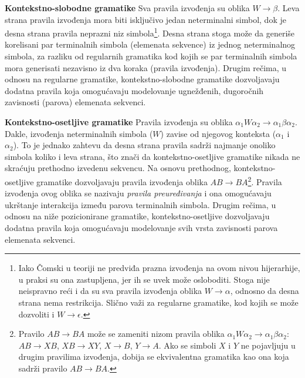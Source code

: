 \documentclass[a4paper, 12pt]{article}
\begin{document}
\vspace*{0.2cm}
\noindent \textbf{Kontekstno-slobodne gramatike} \hspace{0.3cm} Sva pravila izvođenja su oblika $W \rightarrow \beta$. Leva strana pravila izvođenja mora biti isključivo jedan neterminalni simbol, dok je desna strana pravila neprazni niz simbola\footnote{Iako Čomski u teoriji ne predviđa prazna izvođenja na ovom nivou hijerarhije, u praksi su ona zastupljena, jer ih se uvek može osloboditi. Stoga nije neispravno reći i da su sva pravila izvođenja oblika $W \rightarrow \alpha$, odnosno da desna strana nema restrikcija. Slično važi za regularne gramatike, kod kojih se može dozvoliti i $W \rightarrow \epsilon$.}. Desna strana stoga može da generiše korelisani par terminalnih simbola (elemenata sekvence) iz jednog neterminalnog simbola, za razliku od regularnih gramatika kod kojih se par terminalnih simbola mora generisati nezavisno iz dva koraka (pravila izvođenja). Drugim rečima, u odnosu na regularne gramatike, kontekstno-slobodne gramatike dozvoljavaju dodatna pravila koja omogućavaju modelovanje ugnežđenih, dugoročnih zavisnosti (parova) elemenata sekvenci.

\vspace*{0.2cm}
\noindent \textbf{Kontekstno-osetljive gramatike} \hspace{0.3cm} Pravila izvođenja su oblika $\alpha_1 W \alpha_2 \rightarrow \alpha_1 \beta \alpha_2$. Dakle, izvođenja neterminalnih simbola ($W$) zavise od njegovog konteksta ($\alpha_1$ i $\alpha_2$). To je jednako zahtevu da desna strana pravila sadrži najmanje onoliko simbola koliko i leva strana, što znači da kontekstno-osetljive gramatike nikada ne skraćuju prethodno izvedenu sekvencu. Na osnovu prethodnog, kontekstno-osetljive gramatike dozvoljavaju pravila izvođenja oblika $AB \rightarrow BA$\footnote{Pravilo $AB \rightarrow BA$ može se zameniti nizom pravila oblika $\alpha_1 W \alpha_2 \rightarrow \alpha_1 \beta \alpha_2$: $AB \rightarrow XB$, $XB \rightarrow XY$, $X \rightarrow B$, $Y \rightarrow A$. Ako se simboli $X$ i $Y$ ne pojavljuju u drugim pravilima izvođenja, dobija se ekvivalentna gramatika kao ona koja sadrži pravilo $AB \rightarrow BA$.}. Pravila izvođenja ovog oblika se nazivaju \textit{pravila preuređivanja} i ona omogućavaju ukrštanje interakcija između parova terminalnih simbola. Drugim rečima, u odnosu na niže pozicionirane gramatike, kontekstno-osetljive dozvoljavaju dodatna pravila koja omogućavaju modelovanje svih vrsta zavisnosti parova elemenata sekvenci.
\end{document}

